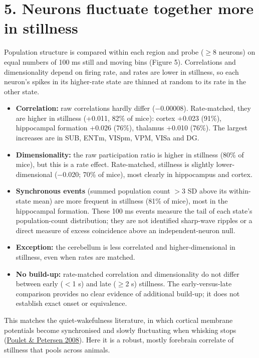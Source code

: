\documentclass[10pt,a4paper]{article}
\begin{document}
\section{5. Neurons fluctuate together more in stillness}
Population structure is compared within each region and probe ($\geq$8 neurons) on equal numbers of 100 ms still and moving bins (Figure 5). Correlations and dimensionality depend on firing rate, and rates are lower in stillness, so each neuron's spikes in its higher-rate state are thinned at random to its rate in the other state.

\begin{itemize}
\item \textbf{Correlation:} raw correlations hardly differ ($-$0.00008). Rate-matched, they are higher in stillness (+0.011, 82\% of mice): cortex +0.023 (91\%), hippocampal formation +0.026 (76\%), thalamus +0.010 (76\%). The largest increases are in SUB, ENTm, VISpm, VPM, VISa and DG.
\item \textbf{Dimensionality:} the raw participation ratio is higher in stillness (80\% of mice), but this is a rate effect. Rate-matched, stillness is slightly lower-dimensional ($-$0.020; 70\% of mice), most clearly in hippocampus and cortex.
\item \textbf{Synchronous events} (summed population count $>$3 SD above its within-state mean) are more frequent in stillness (81\% of mice), most in the hippocampal formation. These 100 ms events measure the tail of each state's population-count distribution; they are not identified sharp-wave ripples or a direct measure of excess coincidence above an independent-neuron null.
\item \textbf{Exception:} the cerebellum is less correlated and higher-dimensional in stillness, even when rates are matched.
\item \textbf{No build-up:} rate-matched correlation and dimensionality do not differ between early ($<$1 s) and late ($\geq$2 s) stillness. The early-versus-late comparison provides no clear evidence of additional build-up; it does not establish exact onset or equivalence.
\end{itemize}
This matches the quiet-wakefulness literature, in which cortical membrane potentials become synchronised and slowly fluctuating when whisking stops (\href{https://www.nature.com/articles/nature07150}{Poulet \& Petersen 2008}). Here it is a robust, mostly forebrain correlate of stillness that pools across animals.
\end{document}
